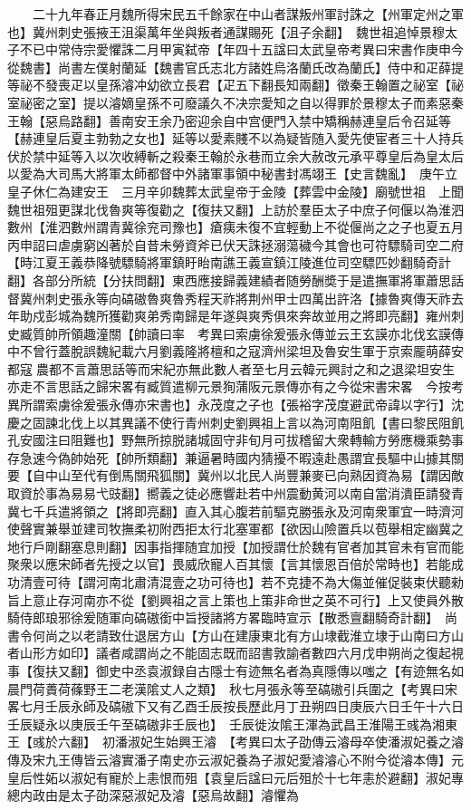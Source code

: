 　　二十九年春正月魏所得宋民五千餘家在中山者謀叛州軍討誅之【州軍定州之軍也】冀州刺史張掖王沮渠萬年坐與叛者通謀賜死【沮子余翻】　魏世祖追悼景穆太子不已中常侍宗愛懼誅二月甲寅弑帝【年四十五諡曰太武皇帝考異曰宋書作庚申今從魏書】尚書左僕射蘭延【魏書官氏志北方諸姓烏洛蘭氏改為蘭氏】侍中和疋薛提等祕不發喪疋以皇孫濬冲幼欲立長君【疋五下翻長知兩翻】徵秦王翰置之祕室【祕室祕密之室】提以濬嫡皇孫不可廢議久不决宗愛知之自以得罪於景穆太子而素惡秦王翰【惡烏路翻】善南安王余乃密迎余自中宫便門入禁中矯稱赫連皇后令召延等【赫連皇后夏主勃勃之女也】延等以愛素賤不以為疑皆随入愛先使宦者三十人持兵伏於禁中延等入以次收縛斬之殺秦王翰於永巷而立余大赦改元承平尊皇后為皇太后以愛為大司馬大將軍太師都督中外諸軍事領中秘書封馮翊王【史言魏亂】　庚午立皇子休仁為建安王　三月辛卯魏葬太武皇帝于金陵【葬雲中金陵】廟號世祖　上聞魏世祖殂更謀北伐魯爽等復勸之【復扶又翻】上訪於羣臣太子中庶子何偃以為淮泗數州【淮泗數州謂青冀徐兖司豫也】瘡痍未復不宜輕動上不從偃尚之之子也夏五月丙申詔曰虐虜窮凶著於自昔未勞資斧已伏天誅拯溺蕩穢今其會也可符驃騎司空二府【時江夏王義恭降號驃騎將軍鎮盱眙南譙王義宣鎮江陵進位司空驃匹妙翻騎奇計翻】各部分所統【分扶問翻】東西應接歸義建績者随勞酬奬于是遣撫軍將軍蕭思話督冀州刺史張永等向碻磝魯爽魯秀程天祚將荆州甲士四萬出許洛【據魯爽傳天祚去年助戍彭城為魏所獲勸爽弟秀南歸是年遂與爽秀俱來奔故並用之將即亮翻】雍州刺史臧質帥所領趣潼關【帥讀曰率　考異曰索虜徐爰張永傳並云王玄謨亦北伐玄謨傳中不曾行蓋脫誤魏紀載六月劉義隆將檀和之寇濟州梁坦及魯安生軍于京索龎萌薛安都寇農都不言蕭思話等而宋紀亦無此數人者至七月云韓元興討之和之退梁坦安生亦走不言思話之歸宋畧有臧質遣柳元景狥蒲阪元景傳亦有之今從宋書宋畧　今按考異所謂索虜徐爰張永傳亦宋書也】永茂度之子也【張裕字茂度避武帝諱以字行】沈慶之固諫北伐上以其異議不使行青州刺史劉興祖上言以為河南阻飢【書曰黎民阻飢孔安國注曰阻難也】野無所掠脱諸城固守非旬月可拔稽留大衆轉輸方勞應機乘勢事存急速今偽帥始死【帥所類翻】兼逼暑時國内猜擾不暇遠赴愚謂宜長驅中山據其關要【自中山至代有倒馬關飛狐關】冀州以北民人尚豐兼麥已向熟因資為易【謂因敵取資於事為易易弋豉翻】嚮義之徒必應響赴若中州震動黄河以南自當消潰臣請發青冀七千兵遣將領之【將即亮翻】直入其心腹若前驅克勝張永及河南衆軍宜一時濟河使聲實兼舉並建司牧撫柔初附西拒太行北塞軍都【欲因山險置兵以苞舉相定幽冀之地行戶剛翻塞息則翻】因事指揮随宜加授【加授謂仕於魏有官者加其官未有官而能聚衆以應宋師者先授之以官】畏威欣寵人百其懷【言其懷恩百倍於常時也】若能成功清壹可待【謂河南北肅清混壹之功可待也】若不克捷不為大傷並催促裝束伏聽勑旨上意止存河南亦不從【劉興祖之言上策也上策非命世之英不可行】上又使員外散騎侍郎琅邪徐爰随軍向碻磝銜中旨授諸將方畧臨時宣示【散悉亶翻騎奇計翻】　尚書令何尚之以老請致仕退居方山【方山在建康東北有方山埭截淮立埭于山南曰方山者山形方如印】議者咸謂尚之不能固志既而詔書敦諭者數四六月戊申朔尚之復起視事【復扶又翻】御史中丞袁淑録自古隱士有迹無名者為真隱傳以嗤之【有迹無名如晨門荷蕢荷蓧野王二老漢隂丈人之類】　秋七月張永等至碻磝引兵圍之【考異曰宋畧七月壬辰永師及碻磝下又有乙酉壬辰按長歷此月丁丑朔四日庚辰六日壬午十六日壬辰疑永以庚辰壬午至碻磝非壬辰也】　壬辰徙汝隂王渾為武昌王淮陽王彧為湘東王【彧於六翻】　初潘淑妃生始興王濬　【考異曰太子劭傳云濬母卒使潘淑妃養之濬傳及宋九王傳皆云濬實潘子南史亦云淑妃養為子淑妃愛濬濬心不附今從濬本傳】元皇后性妬以淑妃有寵於上恚恨而殂【袁皇后諡曰元后殂於十七年恚於避翻】淑妃專總内政由是太子劭深惡淑妃及濬【惡烏故翻】濬懼為